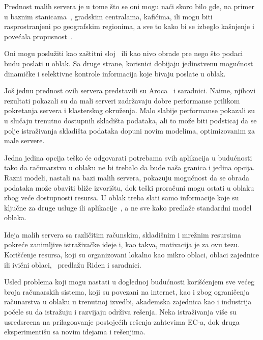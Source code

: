 Prednost malih servera je u tome \v sto se oni mogu na\'ci skoro bilo gde, na primer u baznim stanicama~\cite{WangZZWYW17}, gradskim centralama, kafi\'cima, ili mogu biti rasprostranjeni po geografskim regionima, a sve to kako bi se izbeglo ka\v snjenje i pove\'cala propusnost~\cite{MonsalveCC18}. 

Oni mogu poslu\v ziti kao za\v stitni sloj~\cite{SatyanarayananK19} ili kao nivo obrade pre nego \v sto podaci budu poslati u oblak. Sa druge strane, korisnici dobijaju jedinstvenu mogu\'cnost dinami\v cke i selektivne kontrole informacija koje bivaju poslate u oblak. 

Jo\v s jednu prednost ovih servera predstavili su  Aroca~\cite{ArocaG12} i saradnici. Naime, njihovi rezultati pokazali su da mali serveri zadr\v zavaju dobre performanse prilikom pokretanja servera i klasterskog okru\v zenja. Malo slabije performanse pokazali su u slu\v caju trenutno dostupnih skladi\v sta podataka, ali to mo\v ze biti podsticaj da se polje istra\v zivanja skladi\v sta podataka dopuni novim modelima, optimizovanim za male servere.

Jedna jedina opcija te\v sko \'ce odgovarati potrebama svih aplikacija u budu\'cnosti tako da ra\v cunarstvo u oblaku ne bi trebalo da bude na\v sa granica i jedina opcija. Razni modeli, nastali na bazi malih servera, pokazuju mogu\'cnost da se obrada podataka mo\v ze obaviti bli\v ze izvori\v stu, dok te\v ski prora\v cuni mogu ostati u oblaku zbog ve\'ce dostupnosti resursa. U oblak treba slati samo informacije koje su klju\v cne za druge usluge ili aplikacije~\cite{inproceedingsSimic1}, a ne sve kako predla\v ze standardni model oblaka. 

Ideja malih servera sa razli\v citim ra\v cunskim, skladi\v snim i mre\v znim resursima pokre\'ce zanimljive istra\v ziva\v cke ideje i, kao takva, motivacija je za ovu tezu. Kori\v s\'cenje resursa, koji su organizovani lokalno kao mikro oblaci, oblaci zajednice ili ivi\v cni oblaci,~\cite{RydenOCW14} predla\v zu Riden i saradnici.

Usled problema koji mogu nastati u doglednoj budu\'cnosti kori\v s\'cenjem sve ve\'ceg broja ra\v cunarskih sistema, koji su povezani na internet, kao i  zbog ograni\v cenja ra\v cunarstva u oblaku u trenutnoj izvedbi, akademska zajednica kao i industrija po\v cele su da istra\v zuju i razvijaju odr\v ziva re\v senja. Neka istra\v zivanja vi\v se su usredsre\dj ena na prilago\dj avanje postoje\'cih re\v senja zahtevima EC-a, dok druga eksperimenti\v su sa novim idejama i re\v senjima.

